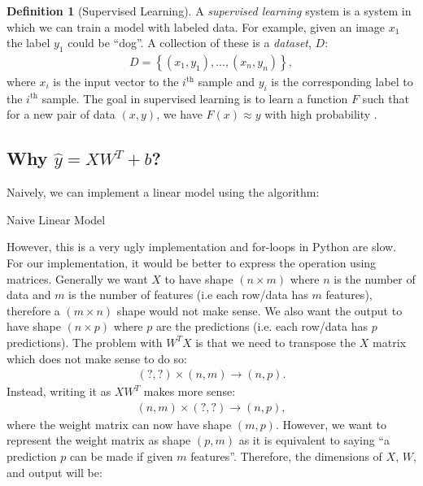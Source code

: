 \documentclass[11pt]{article}
\numberwithin{equation}{section}
\theoremstyle{definition}%
\newtheorem{definition}{Definition}[section]%
\newcommand{\pluseq}{\mathrel{+}=}
\begin{document}
\begin{definition}[Supervised Learning]
A \emph{supervised learning} system is a system in which we can train a model with labeled data. For example, given an image $x_{1}$ the label $y_{1}$ could be ``dog''. A collection of these is a \emph{dataset}, $D$:
\begin{align}
D= \left\{(x_1, y_1), ..., (x_n, y_n)\right\},
\end{align}
where $x_i$ is the input vector to the $i^{\text{th}}$ sample and $y_i$ is the corresponding label to the $i^{\text{th}}$ sample. The goal in supervised learning is to learn a function $F$ such that for a new pair of data $(x, y)$, we have $F(x) \approx y$ with high probability \cite{Cornell}.
\end{definition}

\subsection{Why $\hat{y} = XW^{T} + b$?}
\label{section:linearconvention}
Naively, we can implement a linear model using the algorithm:
\begin{algorithm}
    \caption{Naive Linear Model}
    \begin{algorithmic}[1]
            \State{$y \pluseq w_j \ast x_j$} 
        \EndFor
    \end{algorithmic}
\end{algorithm}

However, this is a very ugly implementation and for-loops in Python are slow. For our implementation, it would be better to express the operation using matrices. Generally we want $X$ to have shape $(n \times m)$ where $n$ is the number of data and $m$ is the number of features (i.e each row/data has $m$ features), therefore a $(m \times n)$ shape would not make sense. We also want the output to have shape $(n \times p)$ where $p$ are the predictions (i.e. each row/data has $p$ predictions). The problem with $W^TX$ is that we need to transpose the $X$ matrix which does not make sense to do so:
\begin{align}
    (?, ?) \times (n, m) \rightarrow (n, p).
\end{align}
Instead, writing it as $XW^T$ makes more sense:
\begin{align}
    (n,m) \times (?,?) \rightarrow (n,p),
\end{align}
where the weight matrix can now have shape $(m,p)$. However, we want to represent the weight matrix as shape $(p,m)$ as it is equivalent to saying ``a prediction $p$ can be made if given $m$ features''. Therefore, the dimensions of $X$, $W$, and output will be:
\end{document}

